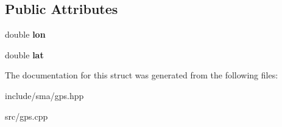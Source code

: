 \subsection*{Public Attributes}
\begin{DoxyCompactItemize}
\item 
\hypertarget{structsma_1_1GPS_1_1Coord_a7947a51769601b61c692ecb914915a73}{double {\bfseries lon}}\label{structsma_1_1GPS_1_1Coord_a7947a51769601b61c692ecb914915a73}

\item 
\hypertarget{structsma_1_1GPS_1_1Coord_a4803d065420279856f30c4a9a8c1bcc6}{double {\bfseries lat}}\label{structsma_1_1GPS_1_1Coord_a4803d065420279856f30c4a9a8c1bcc6}

\end{DoxyCompactItemize}


The documentation for this struct was generated from the following files\-:\begin{DoxyCompactItemize}
\item 
include/sma/gps.\-hpp\item 
src/gps.\-cpp\end{DoxyCompactItemize}
